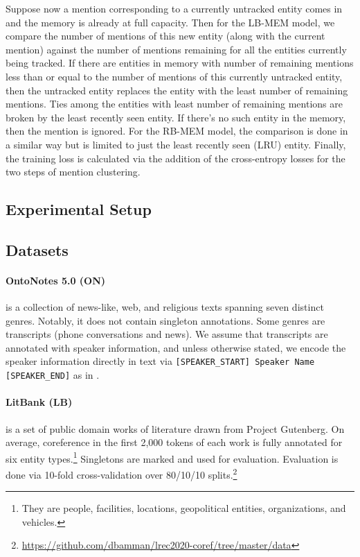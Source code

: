 \documentclass[12pt]{thesis-umich}[thesis]
\newcommand{\learned}{LB-MEM\xspace}
\newcommand{\lru}{RB-MEM\xspace}
\begin{document}
Suppose now a mention corresponding to a currently untracked entity comes in and the memory is already at full capacity.
Then for the \learned model, we compare the number of mentions of this new entity (along with the current mention) against the number of mentions remaining for all the entities currently being tracked. If there are entities in memory with number of remaining mentions less than or equal to the number of mentions of this currently untracked entity, then the untracked entity replaces the entity with the least number of remaining mentions. Ties among the entities with least number of remaining mentions are broken by the least recently seen entity. If there's no such entity in the memory, then the mention is ignored.
For the \lru model, the comparison is done in a similar way but is limited to just the least recently seen (LRU) entity.
Finally, the training loss is calculated via the addition of the cross-entropy losses for the two steps of mention clustering.

\subsection{Experimental Setup}


\subsection*{Datasets}
\label{sec:long_doc_datasets}


\paragraph{OntoNotes 5.0 (ON)} \cite{weischedel2013ontonotes} is a collection of news-like, web, and religious texts spanning seven distinct genres. 
Notably, it does not contain singleton annotations. Some genres are transcripts (phone conversations and news). We assume that transcripts are annotated with speaker information, and unless otherwise stated, we encode the speaker information directly in text via \texttt{[SPEAKER\_START] Speaker Name [SPEAKER\_END]} as in \citet{wu-etal-2020-corefqa}.

\paragraph{LitBank (LB)} \cite{bamman2019annotated} is a set of public domain works of literature drawn from Project Gutenberg. On average, coreference in the first 2,000 tokens of each work is fully annotated for six entity types.\footnote{They are people, facilities, locations, geopolitical entities, organizations, and vehicles.}
Singletons are marked and used for evaluation.  Evaluation is done via 10-fold cross-validation over 80/10/10 splits.\footnote{\url{https://github.com/dbamman/lrec2020-coref/tree/master/data}}
\end{document}

